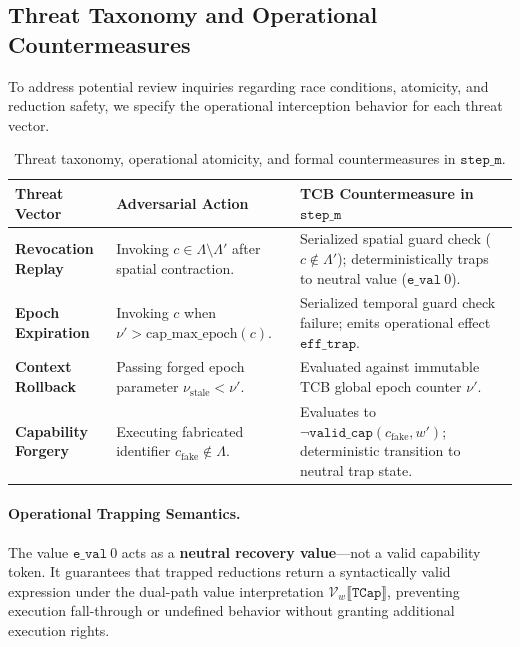 \subsection{Threat Taxonomy and Operational Countermeasures}

To address potential review inquiries regarding race conditions, atomicity, and reduction safety, we specify the operational interception behavior for each threat vector.

\begin{table}[h]
\centering
\small
\begin{tabularx}{\textwidth}{l X X}
\hline
\textbf{Threat Vector} & \textbf{Adversarial Action} & \textbf{TCB Countermeasure in $\mathtt{step\_m}$} \\
\hline
\textbf{Revocation Replay} & Invoking $c \in \Lambda \setminus \Lambda'$ after spatial contraction. & Serialized spatial guard check ($c \notin \Lambda'$); deterministically traps to neutral value ($\mathtt{e\_val}~0$). \\
\textbf{Epoch Expiration} & Invoking $c$ when $\nu' > \text{cap\_max\_epoch}(c)$. & Serialized temporal guard check failure; emits operational effect $\mathtt{eff\_trap}$. \\
\textbf{Context Rollback} & Passing forged epoch parameter $\nu_{\text{stale}} < \nu'$. & Evaluated against immutable TCB global epoch counter $\nu'$. \\
\textbf{Capability Forgery} & Executing fabricated identifier $c_{\text{fake}} \notin \Lambda$. & Evaluates to $\neg\mathtt{valid\_cap}(c_{\text{fake}}, w')$; deterministic transition to neutral trap state. \\
\hline
\end{tabularx}
\caption{Threat taxonomy, operational atomicity, and formal countermeasures in $\mathtt{step\_m}$.}
\label{tab:threat_taxonomy}
\end{table}

\paragraph{Operational Trapping Semantics.}
The value $\mathtt{e\_val}~0$ acts as a \textbf{neutral recovery value}—not a valid capability token. It guarantees that trapped reductions return a syntactically valid expression under the dual-path value interpretation $\mathcal{V}_w \llbracket \mathtt{TCap} \rrbracket$, preventing execution fall-through or undefined behavior without granting additional execution rights.

